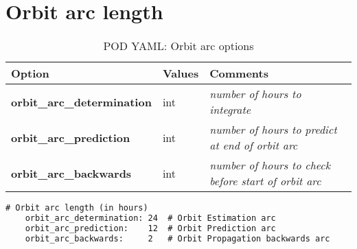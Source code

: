 \section{Orbit arc length}
\begin{table}[h!]
	\begin{tabular}{|p{4.5cm}|p{2cm}|p{3.5cm}|}
		\hline
		Option & Values & Comments \\
		\hline
		\textbf{orbit\_arc\_determination} & int &\emph{number of hours to integrate}\\
		\textbf{orbit\_arc\_prediction} & int &  \emph{number of hours to predict at end of orbit arc}\\
		\textbf{orbit\_arc\_backwards} & int & \emph{number of hours to check before start of orbit arc}\\
		\hline
	\end{tabular}
	\caption{POD YAML: Orbit arc options}
	\label{table:pod_yaml_orbit_arc}
\end{table}
%
\begin{lstlisting}[language=xml,caption=orbit arc length yaml configuration example]
# Orbit arc length (in hours)
	orbit_arc_determination: 24  # Orbit Estimation arc
	orbit_arc_prediction:    12  # Orbit Prediction arc
	orbit_arc_backwards:     2   # Orbit Propagation backwards arc
\end{lstlisting}
%
